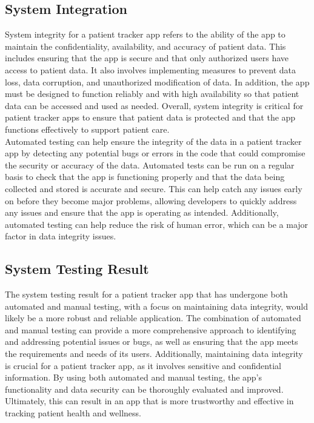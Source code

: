 \documentclass[12pt]{article}
\begin{document}
			\subsection{System Integration}
			\quad System integrity for a patient tracker app refers to the ability of the app to maintain the confidentiality, availability, and accuracy of patient data. This includes ensuring that the app is secure and that only authorized users have access to patient data. It also involves implementing measures to prevent data loss, data corruption, and unauthorized modification of data. In addition, the app must be designed to function reliably and with high availability so that patient data can be accessed and used as needed. Overall, system integrity is critical for patient tracker apps to ensure that patient data is protected and that the app functions effectively to support patient care.\\
			
			\quad Automated testing can help ensure the integrity of the data in a patient tracker app by detecting any potential bugs or errors in the code that could compromise the security or accuracy of the data. Automated tests can be run on a regular basis to check that the app is functioning properly and that the data being collected and stored is accurate and secure. This can help catch any issues early on before they become major problems, allowing developers to quickly address any issues and ensure that the app is operating as intended. Additionally, automated testing can help reduce the risk of human error, which can be a major factor in data integrity issues.
			\subsection{System Testing Result}
			
			\quad The system testing result for a patient tracker app that has undergone both automated and manual testing, with a focus on maintaining data integrity, would likely be a more robust and reliable application. The combination of automated and manual testing can provide a more comprehensive approach to identifying and addressing potential issues or bugs, as well as ensuring that the app meets the requirements and needs of its users. Additionally, maintaining data integrity is crucial for a patient tracker app, as it involves sensitive and confidential information. By using both automated and manual testing, the app's functionality and data security can be thoroughly evaluated and improved. Ultimately, this can result in an app that is more trustworthy and effective in tracking patient health and wellness.
\end{document}
